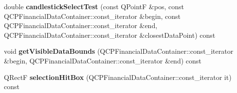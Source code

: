 \begin{DoxyCompactItemize}
\item 
\mbox{\label{class_q_c_p_financial_a9783e91a33fd08a402b1a3821d43e471}} 
double {\bfseries candlestick\+Select\+Test} (const Q\+PointF \&pos, const Q\+C\+P\+Financial\+Data\+Container\+::const\+\_\+iterator \&begin, const Q\+C\+P\+Financial\+Data\+Container\+::const\+\_\+iterator \&end, Q\+C\+P\+Financial\+Data\+Container\+::const\+\_\+iterator \&closest\+Data\+Point) const
\item 
\mbox{\label{class_q_c_p_financial_a31a3dda8b6b9a5b674e28f1daeb21a75}} 
void {\bfseries get\+Visible\+Data\+Bounds} (Q\+C\+P\+Financial\+Data\+Container\+::const\+\_\+iterator \&begin, Q\+C\+P\+Financial\+Data\+Container\+::const\+\_\+iterator \&end) const
\item 
\mbox{\label{class_q_c_p_financial_afbe9e8cb0de3e9e789a9668b29cad098}} 
Q\+RectF {\bfseries selection\+Hit\+Box} (Q\+C\+P\+Financial\+Data\+Container\+::const\+\_\+iterator it) const
\end{DoxyCompactItemize}
